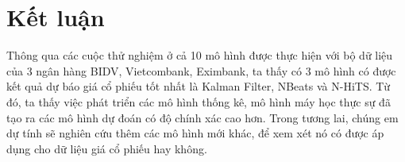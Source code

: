 \section{Kết luận}
Thông qua các cuộc thử nghiệm ở cả 10 mô hình được thực hiện với bộ dữ liệu của 3 ngân hàng BIDV, Vietcombank, Eximbank, ta thấy có 3 mô hình có được kết quả dự báo giá cổ phiếu tốt nhất là Kalman Filter, NBeats và N-HiTS. Từ đó, ta thấy việc phát triển các mô hình thống kê, mô hình máy học thực sự đã tạo ra các mô hình dự đoán có độ chính xác cao hơn. Trong tương lai, chúng em dự tính sẽ nghiên cứu thêm các mô hình mới khác, để xem xét nó có được áp dụng cho dữ liệu giá cổ phiếu hay không.
